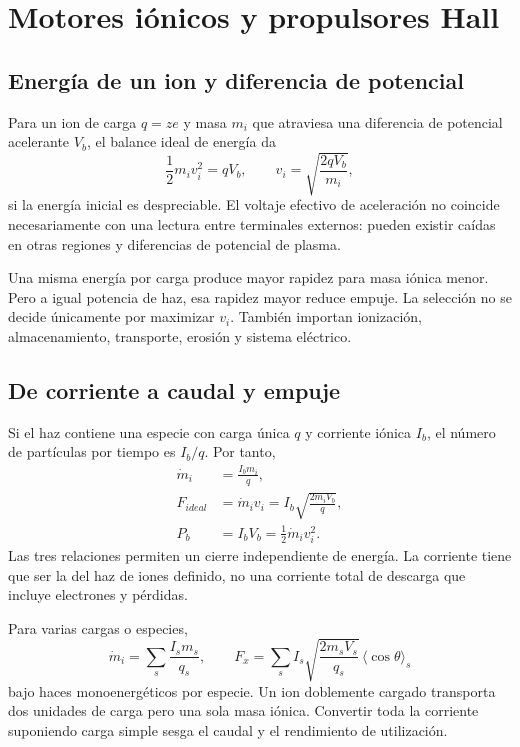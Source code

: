 \chapter{Motores iónicos y propulsores Hall}\label{ch:23}
\section{Energía de un ion y diferencia de potencial}
Para un ion de carga $q=ze$ y masa $m_i$ que atraviesa una diferencia de potencial acelerante $V_b$, el balance ideal de energía da
\[
 \frac12m_iv_i^2=qV_b,
 \qquad v_i=\sqrt{\frac{2qV_b}{m_i}},
\]
si la energía inicial es despreciable. El voltaje efectivo de aceleración no coincide necesariamente con una lectura entre terminales externos: pueden existir caídas en otras regiones y diferencias de potencial de plasma.

Una misma energía por carga produce mayor rapidez para masa iónica menor. Pero a igual potencia de haz, esa rapidez mayor reduce empuje. La selección no se decide únicamente por maximizar $v_i$. También importan ionización, almacenamiento, transporte, erosión y sistema eléctrico.\cite{JPL-EP}
\section{De corriente a caudal y empuje}
Si el haz contiene una especie con carga única $q$ y corriente iónica $I_b$, el número de partículas por tiempo es $I_b/q$. Por tanto,
\begin{align}
 \dot m_i&=\frac{I_bm_i}{q},\\
 F_{ideal}&=\dot m_iv_i=I_b\sqrt{\frac{2m_iV_b}{q}},\\
 P_b&=I_bV_b=\frac12\dot m_iv_i^2.
\end{align}
Las tres relaciones permiten un cierre independiente de energía. La corriente tiene que ser la del haz de iones definido, no una corriente total de descarga que incluye electrones y pérdidas.

Para varias cargas o especies,
\[
 \dot m_i=\sum_s\frac{I_sm_s}{q_s},\qquad
 F_x=\sum_s I_s\sqrt{\frac{2m_sV_s}{q_s}}\,\langle\cos\theta\rangle_s
\]
bajo haces monoenergéticos por especie. Un ion doblemente cargado transporta dos unidades de carga pero una sola masa iónica. Convertir toda la corriente suponiendo carga simple sesga el caudal y el rendimiento de utilización.
